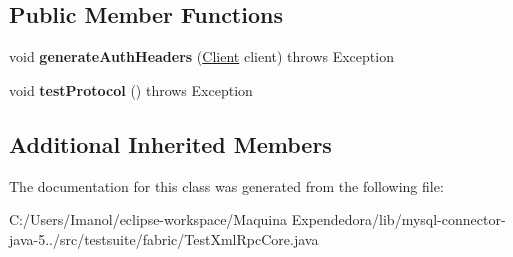 \subsection*{Public Member Functions}
\begin{DoxyCompactItemize}
\item 
\mbox{\label{classtestsuite_1_1fabric_1_1_test_xml_rpc_core_a5ed49183cddc8979e88d57990a62a165}} 
void {\bfseries generate\+Auth\+Headers} (\mbox{\hyperlink{classcom_1_1mysql_1_1fabric_1_1xmlrpc_1_1_client}{Client}} client)  throws Exception 
\item 
\mbox{\label{classtestsuite_1_1fabric_1_1_test_xml_rpc_core_ac1e82e0e84c5380fe99324a9bc30b04a}} 
void {\bfseries test\+Protocol} ()  throws Exception 
\end{DoxyCompactItemize}
\subsection*{Additional Inherited Members}


The documentation for this class was generated from the following file\+:\begin{DoxyCompactItemize}
\item 
C\+:/\+Users/\+Imanol/eclipse-\/workspace/\+Maquina Expendedora/lib/mysql-\/connector-\/java-\/5../src/testsuite/fabric/Test\+Xml\+Rpc\+Core.\+java\end{DoxyCompactItemize}
